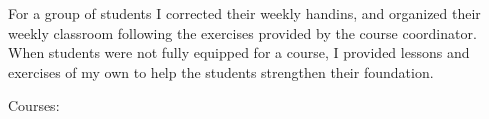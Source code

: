 
For a group of students I corrected their weekly handins, and organized their
weekly classroom following the exercises provided by the course coordinator.
When students were not fully equipped for a course, I provided lessons and
exercises of my own to help the students strengthen their foundation.

\medskip

Courses:
 
